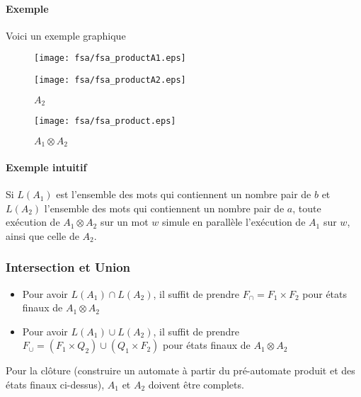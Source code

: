 \documentclass[a4paper]{article}
\begin{document}
  \paragraph{Exemple} Voici un exemple graphique

  \begin{figure}[H]
    \begin{center}
      \begin{minipage}{0.45\textwidth}
        \texttt{[image: fsa/fsa\_productA1.eps]}
        \caption{$A_1$}
      \end{minipage}\hfill
      \begin{minipage}{0.45\textwidth}
        \texttt{[image: fsa/fsa\_productA2.eps]}
        \caption{$A_2$}
      \end{minipage}
    \end{center}
  \end{figure}

  \begin{figure}[H]
    \begin{center}
      \texttt{[image: fsa/fsa\_product.eps]}
      \caption{$A_1 \otimes A_2$}
    \end{center}
  \end{figure}

  \paragraph{Exemple intuitif} Si $L(A_1)$ est l'ensemble des mots qui contiennent
  un nombre pair de $b$ et $L(A_2)$ l'ensemble des mots qui contiennent un 
  nombre pair de $a$, toute exécution de $A_1 \otimes A_2$ sur un mot $w$ simule
  en parallèle l'exécution de $A_1$ sur $w$, ainsi que celle de $A_2$.

  \subsubsection{Intersection et Union}
  \begin{itemize}
    \item Pour avoir $L(A_1) \cap L(A_2)$, il suffit de prendre $F_\cap = F_1 \times F_2$
    pour états finaux de $A_1 \otimes A_2$
    \item Pour avoir $L(A_1) \cup L(A_2)$, il suffit de prendre $F_\cup = (F_1 \times Q_2) \cup (Q_1 \times F_2)$
    pour états finaux de $A_1 \otimes A_2$
  \end{itemize}
  Pour la clôture (construire un automate à partir du pré-automate produit et des états
  finaux ci-dessus), $A_1$ et $A_2$ doivent être complets.
\end{document}
